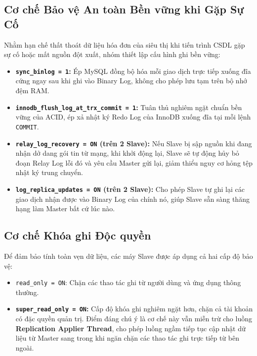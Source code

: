 \documentclass[12pt,a4paper]{report}
\begin{document}
\subsection{Cơ chế Bảo vệ An toàn Bền vững khi Gặp Sự Cố}
Nhằm hạn chế thất thoát dữ liệu hóa đơn của siêu thị khi tiến trình CSDL gặp sự cố hoặc mất nguồn đột xuất, nhóm thiết lập cấu hình ghi bền vững:
\begin{itemize}
    \item \textbf{\texttt{sync\_binlog = 1}:} Ép MySQL đồng bộ hóa mỗi giao dịch trực tiếp xuống đĩa cứng ngay sau khi ghi vào Binary Log, không cho phép lưu tạm trên bộ nhớ đệm RAM.
    \item \textbf{\texttt{innodb\_flush\_log\_at\_trx\_commit = 1}:} Tuân thủ nghiêm ngặt chuẩn bền vững của ACID, ép xả nhật ký Redo Log của InnoDB xuống đĩa tại mỗi lệnh \texttt{COMMIT}.
    \item \textbf{\texttt{relay\_log\_recovery = ON} (trên 2 Slave):} Nếu Slave bị sập nguồn khi đang nhận dở dang gói tin từ mạng, khi khởi động lại, Slave sẽ tự động hủy bỏ đoạn Relay Log lỗi đó và yêu cầu Master gửi lại, giảm thiểu nguy cơ hỏng tệp nhật ký trung chuyển.
    \item \textbf{\texttt{log\_replica\_updates = ON} (trên 2 Slave):} Cho phép Slave tự ghi lại các giao dịch nhận được vào Binary Log của chính nó, giúp Slave sẵn sàng thăng hạng làm Master bất cứ lúc nào.
\end{itemize}

\subsection{Cơ chế Khóa ghi Độc quyền}
Để đảm bảo tính toàn vẹn dữ liệu, các máy Slave được áp dụng cả hai cấp độ bảo vệ:
\begin{itemize}
    \item \texttt{read\_only = ON}: Chặn các thao tác ghi từ người dùng và ứng dụng thông thường.
    \item \textbf{\texttt{super\_read\_only = ON}:} Cấp độ khóa ghi nghiêm ngặt hơn, chặn cả tài khoản có đặc quyền quản trị. Điểm đáng chú ý là cơ chế này vẫn miễn trừ cho luồng \textbf{Replication Applier Thread}, cho phép luồng ngầm tiếp tục cập nhật dữ liệu từ Master sang trong khi ngăn chặn các thao tác ghi trực tiếp từ bên ngoài.
\end{itemize}
\end{document}
